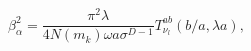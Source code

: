\begin{equation}
\beta _{\alpha }^{2}=\frac{\pi ^{2}\lambda }{4N(m_{k})\omega a\sigma ^{D-1}}%
T_{\nu _{l} }^{ab}(b/a,\lambda a),  \label{betanormab}
\end{equation}


